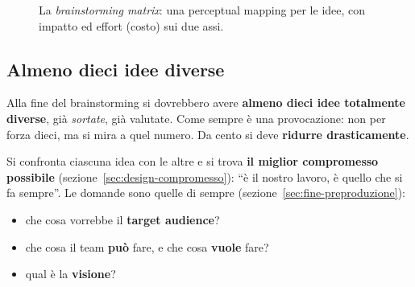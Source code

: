 \begin{figure}[htbp]
\centering
{}
\caption{La \emph{brainstorming matrix}: una perceptual mapping per le idee,
con impatto ed effort (costo) sui due assi.}
\label{fig:brainstorming-matrix}
\end{figure}

\subsection{Almeno dieci idee diverse}

Alla fine del brainstorming si dovrebbero avere \textbf{almeno dieci idee
totalmente diverse}, già \emph{sortate}, già valutate. Come sempre è una
provocazione: non per forza dieci, ma si mira a quel numero. Da cento si
deve \textbf{ridurre drasticamente}.

Si confronta ciascuna idea con le altre e si trova \textbf{il miglior
compromesso possibile} (sezione~\ref{sec:design-compromesso}): ``è il nostro
lavoro, è quello che si fa sempre''. Le domande sono quelle di sempre
(sezione~\ref{sec:fine-preproduzione}):
\begin{itemize}
  \item che cosa vorrebbe il \textbf{target audience}?
  \item che cosa il team \textbf{può} fare, e che cosa \textbf{vuole} fare?
  \item qual è la \textbf{visione}?
\end{itemize}

